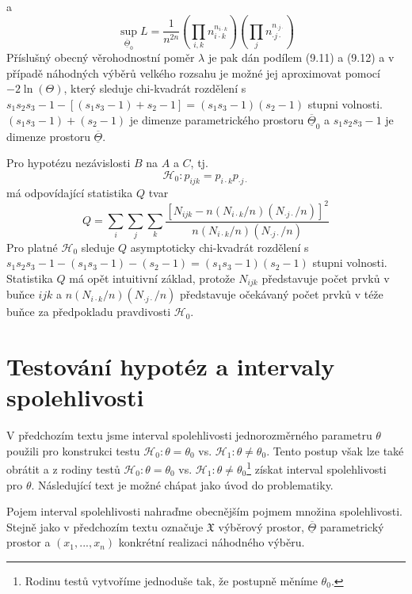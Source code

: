 a
\begin{equation}
\sup_{\overline{\underline{\Theta}}_0} L = \frac{1}{n^{2n}}\left(\prod_{i,k} n_{i \cdot k}^{n_{i \cdot k}}\right)\left(\prod_j n_{\cdot j \cdot}^{n_{\cdot j \cdot}}\right)
\end{equation}
Příslušný obecný věrohodnostní poměr $\lambda$ je pak dán podílem (9.11) a (9.12) a v případě náhodných výběrů velkého rozsahu je možné jej aproximovat pomocí $-2 \ln(\Theta)$, který sleduje chi-kvadrát rozdělení s $s_1s_2s_3 - 1 - [(s_1s_3 - 1) + s_2 - 1] = (s_1s_3 - 1)(s_2 - 1)$ stupni volnosti. $(s_1s_3 - 1) + (s_2 - 1)$ je dimenze parametrického prostoru $\overline{\underline{\Theta}}_0$ a $s_1s_2s_3 - 1$ je dimenze prostoru $\overline{\underline{\Theta}}$.

Pro hypotézu nezávislosti $B$ na $A$ a $C$, tj.
\begin{equation*}
\mathscr{H}_0: p_{ijk} = p_{i \cdot k} p_{\cdot j \cdot}
\end{equation*}
má odpovídající statistika $Q$ tvar
\begin{equation*}
Q = \sum_i \sum_j \sum_k \frac{[N_{ijk} - n(N_{i \cdot k}/n)(N_{\cdot j \cdot}/n)]^2}{n(N_{i \cdot k}/n)(N_{\cdot j \cdot }/n)}
\end{equation*}
Pro platné $\mathscr{H}_0$ sleduje $Q$ asymptoticky chi-kvadrát rozdělení s $s_1s_2s_3 - 1 - (s_1s_3 - 1) - (s_2 - 1) = (s_1s_3 - 1)(s_2 - 1)$ stupni volnosti. Statistika $Q$ má opět intuitivní základ, protože $N_{ijk}$ představuje počet prvků v buňce $ijk$ a $n(N_{i \cdot k}/n)(N_{\cdot j \cdot}/n)$ představuje očekávaný počet prvků v téže buňce za předpokladu pravdivosti $\mathscr{H}_0$.

\section{Testování hypotéz a intervaly spolehlivosti}

V předchozím textu jsme interval spolehlivosti jednorozměrného parametru $\theta$ použili pro konstrukci testu $\mathscr{H}_0: \theta = \theta_0$ vs. $\mathscr{H}_1: \theta \neq \theta_0$. Tento postup však lze také obrátit a z rodiny testů $\mathscr{H}_0: \theta = \theta_0$ vs. $\mathscr{H}_1: \theta \neq \theta_0$\footnote{Rodinu testů vytvoříme jednoduše tak, že postupně měníme $\theta_0$.} získat interval spolehlivosti pro $\theta$. Následující text je možné chápat jako úvod do problematiky.

Pojem interval spolehlivosti nahraďme obecnějším pojmem množina spolehlivosti. Stejně jako v předchozím textu označuje $\mathfrak{X}$ výběrový prostor, $\overline{\underline{\Theta}}$ parametrický prostor a $(x_1, ..., x_n)$ konkrétní realizaci náhodného výběru.

